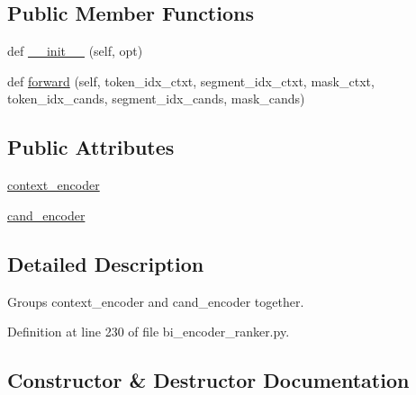 \subsection*{Public Member Functions}
\begin{DoxyCompactItemize}
\item 
def \hyperlink{classparlai_1_1agents_1_1bert__ranker_1_1bi__encoder__ranker_1_1BiEncoderModule_a81f376495538cf4d413cd9b63184d045}{\+\_\+\+\_\+init\+\_\+\+\_\+} (self, opt)
\item 
def \hyperlink{classparlai_1_1agents_1_1bert__ranker_1_1bi__encoder__ranker_1_1BiEncoderModule_a74b6c842e6e99d8a86f669e385ae48e9}{forward} (self, token\+\_\+idx\+\_\+ctxt, segment\+\_\+idx\+\_\+ctxt, mask\+\_\+ctxt, token\+\_\+idx\+\_\+cands, segment\+\_\+idx\+\_\+cands, mask\+\_\+cands)
\end{DoxyCompactItemize}
\subsection*{Public Attributes}
\begin{DoxyCompactItemize}
\item 
\hyperlink{classparlai_1_1agents_1_1bert__ranker_1_1bi__encoder__ranker_1_1BiEncoderModule_aa92bf5d244fe4f11ea2211353d7aad6f}{context\+\_\+encoder}
\item 
\hyperlink{classparlai_1_1agents_1_1bert__ranker_1_1bi__encoder__ranker_1_1BiEncoderModule_a719af14e2b84f3a52eec12b94ff0c35f}{cand\+\_\+encoder}
\end{DoxyCompactItemize}


\subsection{Detailed Description}
\begin{DoxyVerb}Groups context_encoder and cand_encoder together.
\end{DoxyVerb}
 

Definition at line 230 of file bi\+\_\+encoder\+\_\+ranker.\+py.



\subsection{Constructor \& Destructor Documentation}
\mbox{\label{classparlai_1_1agents_1_1bert__ranker_1_1bi__encoder__ranker_1_1BiEncoderModule_a81f376495538cf4d413cd9b63184d045}} 
